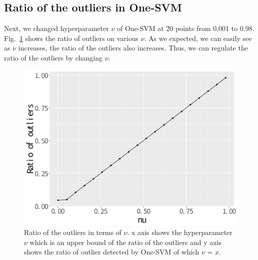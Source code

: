 \documentclass[dvipdfmx, english]{ampmt}             %
\newcommand{\Figref}[1]{Fig.~\ref{#1}}
\begin{document}
\subsection{Ratio of the outliers in One-SVM}
Next, we changed hyperparameter $\nu$ of One-SVM at 20 points from 0.001 to 0.98. \Figref{fig:nu} shows the ratio of outliers on various $\nu$.
As we expected, we can easily see as $\nu$ increases, the ratio of the outliers also increases. Thus, we can regulate the ratio of the outliers by changing $\nu$.
\begin{figure}[H]
\centerline{\includegraphics[scale=0.32]{../img/ratio-of-outliers.pdf}}
\caption{Ratio of the outliers in terms of  $\nu$. x axis shows the hyperparameter $\nu$ which is an upper bound of the ratio of the outliers and y axis shows
the ratio of outlier detected by One-SVM of which $\nu$ = $x$.}
\label{fig:nu}
\end{figure}
\end{document}
